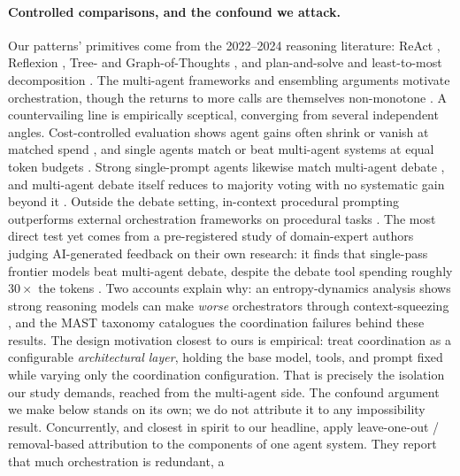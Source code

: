 \documentclass[11pt]{article}
\begin{document}
\paragraph{Controlled comparisons, and the confound we attack.} Our patterns'
primitives come from the 2022--2024 reasoning literature: ReAct \citep{yao2023react},
Reflexion \citep{shinn2023reflexion}, Tree- and Graph-of-Thoughts
\citep{yao2023tot,besta2024got}, and plan-and-solve and least-to-most decomposition
\citep{wang2023plansolve,zhou2023leasttomost}. The multi-agent frameworks
\citep{wu2023autogen,hong2024metagpt} and ensembling arguments
\citep{wang2024moa,li2024moreagents} motivate orchestration, though the returns to more
calls are themselves non-monotone \citep{chen2024morecalls}. A countervailing line is empirically sceptical, converging
from several independent angles. Cost-controlled evaluation shows
agent gains often shrink or vanish at matched spend \citep{kapoor2024aiagents}, and
single agents match or beat multi-agent systems at equal token
budgets \citep{tran2026single}. Strong single-prompt agents likewise match multi-agent
debate \citep{wang2024rethinking}, and multi-agent debate itself reduces to majority
voting with no systematic gain beyond it \citep{choi2025debatevote}. Outside the debate
setting, in-context procedural prompting outperforms external
orchestration frameworks on procedural tasks \citep{incontextorch2026}. The most direct
test yet comes from a pre-registered study of domain-expert authors judging AI-generated
feedback on their own research: it finds that single-pass frontier models beat
multi-agent debate, despite the debate tool spending roughly $30\times$ the tokens
\citep{havranek2026debate}. Two
accounts explain why: an entropy-dynamics analysis shows strong reasoning models can
make \emph{worse} orchestrators through context-squeezing \citep{zhu2026reasoningtrap},
and the MAST taxonomy \citep{cemri2025mast} catalogues the coordination failures behind
these results. The design motivation closest to ours is empirical:
\citet{nechepurenko2026coordination} treat coordination as a configurable
\emph{architectural layer}, holding the base model, tools, and prompt fixed while
varying only the coordination configuration. That is precisely the isolation our study
demands, reached from the multi-agent side. The confound
argument we make below stands on its own; we do not attribute it to any impossibility
result. Concurrently, and closest in spirit to our headline,
\citet{lu2026agentsthatmatter} apply leave-one-out / removal-based attribution to the
components of one agent system. They report that much orchestration is redundant, a
\end{document}
